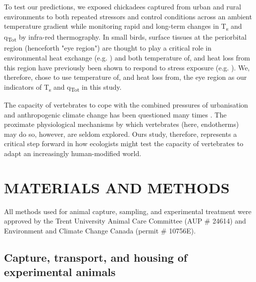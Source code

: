 \documentclass[12pt]{article}
\begin{document}
\noindent To test our predictions, we exposed chickadees captured from urban and rural environments to both repeated stressors and control conditions across an ambient temperature gradient while monitoring rapid and long-term changes in T\textsubscript{s} and q\textsubscript{Tot} by infra-red thermography. In small birds, surface tissues at the periorbital region (henceforth "eye region") are thought to play a critical role in environmental heat exchange (e.g. \citealt{hill_1980,powers_2015}) and both temperature of, and heat loss from this region have previously been shown to respond to stress exposure (e.g. \citealt{jerem_2015,ikkatai_2015,herborn_2018,robertson_2020a}). We, therefore, chose to use temperature of, and heat loss from, the eye region as our indicators of T\textsubscript{s} and q\textsubscript{Tot} in this study. \vspace{1cm}

\noindent The capacity of vertebrates to cope with the combined pressures of urbanisation and anthropogenic climate change has been questioned many times \citep{pautasso_2012,argueso_2015,brans_2017}. The proximate physiological mechanisms by which vertebrates (here, endotherms) may do so, however, are seldom explored. Ours study, therefore, represents a critical step forward in how ecologists might test the capacity of vertebrates to adapt an increasingly human-modified world. \vspace{0.5cm}

\section{MATERIALS AND METHODS}
\vspace{0.5cm}

\noindent All methods used for animal capture, sampling, and experimental treatment were approved by the Trent University Animal Care Committee (AUP \# 24614) and Environment and Climate Change Canada (permit \# 10756E).\vspace{0.5cm}

\subsection{Capture, transport, and housing of experimental animals}
\vspace{0.5cm}
\end{document}
